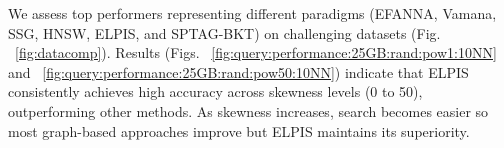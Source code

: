  We assess top performers representing different paradigms (EFANNA, Vamana, SSG, HNSW, ELPIS, and SPTAG-BKT) on challenging datasets (Fig. ~\ref{fig:datacomp}). Results (Figs. ~\ref{fig:query:performance:25GB:rand:pow1:10NN} and ~\ref{fig:query:performance:25GB:rand:pow50:10NN}) indicate that ELPIS consistently achieves high accuracy across skewness levels (0 to 50), outperforming other methods. As skewness increases, search becomes easier so most graph-based approaches improve but ELPIS maintains its superiority.
 
\begin{comment}
\ilias{I mention this in discussion}
The majority of graph-based approaches exhibit an interesting trend \karima{what is this trend?}, not only on the synthetic datasets but also on the Seismic and Sald real datasets, which present significant difficulties (Figure ~\ref{fig}) and challenging queries (Figure ~\ref{fig:search:query:performance:25GB}) \karima{fix the figure numbers} \karima{what are these difficulties and why are the queries challenging?}. We observe that the DC-based approaches outperform ND-based approaches in query performance, as the latter often become trapped in local minima \karima{in which plot do we see this? what are the methods?}. In contrast, DC-based approaches like SPTAG and ELPIS both
achieve better performance on hard datasets and out-of-distribution queries. This is because they both effectively navigate various regions of the data space: SPTAG constructs more refined connections during its building of multiple graphs, and ELPIS leverages multi-cluster search capabilities.
\end{comment}




